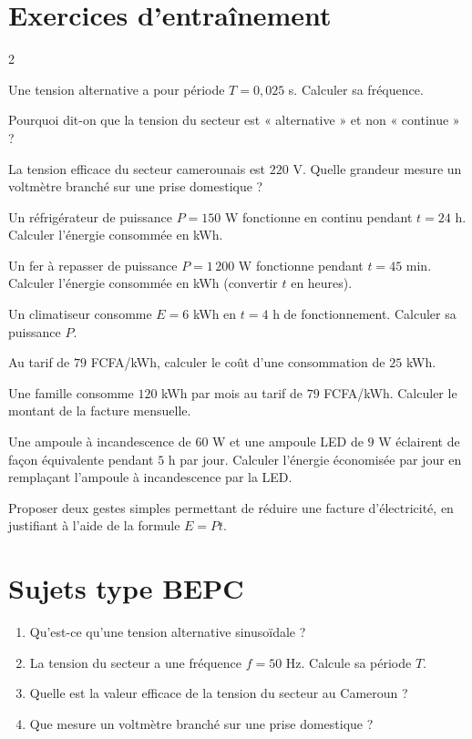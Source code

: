 \section{Exercices d'entraînement}
\begin{multicols}{2}

\exo{} Une tension alternative a pour période $T=0{,}025$ s. Calculer sa
fréquence.

\exo{} Pourquoi dit-on que la tension du secteur est « alternative » et non
« continue » ?

\exo{} La tension efficace du secteur camerounais est $220$ V. Quelle grandeur
mesure un voltmètre branché sur une prise domestique ?

\exo{} Un réfrigérateur de puissance $P=150$ W fonctionne en continu pendant
$t=24$ h. Calculer l'énergie consommée en kWh.

\exo{} Un fer à repasser de puissance $P=1\,200$ W fonctionne pendant
$t=45$ min. Calculer l'énergie consommée en kWh (convertir $t$ en heures).

\exo{} Un climatiseur consomme $E=6$ kWh en $t=4$ h de fonctionnement. Calculer
sa puissance $P$.

\exo{} Au tarif de $79$ FCFA/kWh, calculer le coût d'une consommation de
$25$ kWh.

\exo{} Une famille consomme $120$ kWh par mois au tarif de $79$ FCFA/kWh.
Calculer le montant de la facture mensuelle.

\exo{} Une ampoule à incandescence de $60$ W et une ampoule LED de $9$ W
éclairent de façon équivalente pendant $5$ h par jour. Calculer l'énergie économisée
par jour en remplaçant l'ampoule à incandescence par la LED.

\exo{} Proposer deux gestes simples permettant de réduire une facture
d'électricité, en justifiant à l'aide de la formule $E=Pt$.

\end{multicols}

\section{Sujets type BEPC}

\begin{enumerate}[label=\arabic*)]
\item Qu'est-ce qu'une tension alternative sinusoïdale ?
\item La tension du secteur a une fréquence $f=50$ Hz. Calcule sa période $T$.
\item Quelle est la valeur efficace de la tension du secteur au Cameroun ?
\item Que mesure un voltmètre branché sur une prise domestique ?
\end{enumerate}

